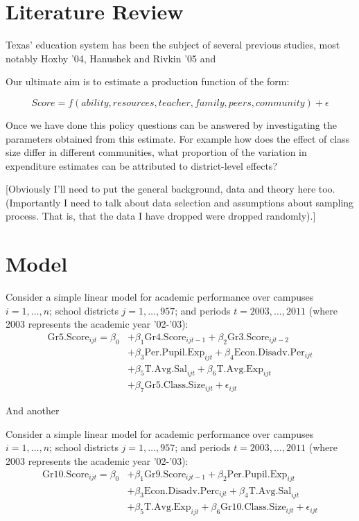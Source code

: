 \documentclass[11pt]{article}
\begin{document}
\section{Literature Review}
\label{s:next}

Texas' education system has been the subject of several previous studies, most notably Hoxby '04, Hanushek and Rivkin '05 and 



Our ultimate aim is to estimate a production function of the form:

$$Score = f(ability,resources,teacher,family,peers,community) + \epsilon$$

Once we have done this policy questions can be answered by investigating the parameters obtained from this estimate. For example how does the effect of class size differ in different communities, what proportion of the variation in expenditure estimates can be attributed to district-level effects?

[Obviously I'll need to put the general background, data and theory here too. (Importantly I need to talk about data selection and assumptions about sampling process. That is, that the data I have dropped were dropped randomly).]

\section{Model}
\label{s:next}

Consider a simple linear model for academic performance over campuses $i=1,\ldots,n$; school districts $j=1,\ldots,957$; and periods $t=2003,\ldots,2011$ (where 2003 represents the academic year '02-'03):
  \begin{align*}
\mathrm{Gr5.Score}_{ijt} = \beta_{0} 
&+ \beta_{1}  \mathrm{Gr4.Score}_{ijt-1} 
+ \beta_{2}  \mathrm{Gr3.Score}_{ijt-2}    \\
&+ \beta_{3}  \mathrm{Per.Pupil.Exp}_{ijt} 
+ \beta_{4}  \mathrm{Econ.Disadv.Per}_{ijt} \\
&+ \beta_{5}  \mathrm{T.Avg.Sal}_{ijt}   
+ \beta_{6}  \mathrm{T.Avg.Exp}_{ijt}  \\
&+ \beta_{7}  \mathrm{Gr5.Class.Size}_{ijt} + \epsilon_{ijt}
\end{align*}

And another

Consider a simple linear model for academic performance over campuses $i=1,\ldots,n$; school districts $j=1,\ldots,957$; and periods $t=2003,\ldots,2011$ (where 2003 represents the academic year '02-'03):
  \begin{align*}
\mathrm{Gr10.Score}_{ijt} = \beta_{0} 
&+ \beta_{1}  \mathrm{Gr9.Score}_{ijt-1} 
+ \beta_{2}  \mathrm{Per.Pupil.Exp}_{ijt} \\
&+ \beta_{3}  \mathrm{Econ.Disadv.Perc}_{ijt} 
+ \beta_{4}  \mathrm{T.Avg.Sal}_{ijt}  \\
&+ \beta_{5}  \mathrm{T.Avg.Exp}_{ijt}  
+ \beta_{6}  \mathrm{Gr10.Class.Size}_{ijt} + \epsilon_{ijt}
\end{align*}
\end{document}
